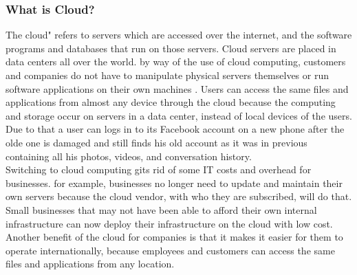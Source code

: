 			\subsubsection{What is Cloud?}
			The cloud" refers to servers which are accessed over the internet, and the software programs and databases that run on those  servers. Cloud servers are placed in data centers all over the world. by way of the use of cloud computing, customers and companies do not have to manipulate physical servers themselves or run software applications on their own machines \cite{cloudref1}. 
			Users can access the same files and applications from almost any device through the cloud because the  computing and storage occur on servers in a data center, instead of local devices of the users. Due to that a user can logs in to its Facebook account on a new phone after the olde one is damaged and still finds his old account as it was in previous containing all his photos, videos, and conversation history. \\
			Switching to cloud computing gits rid of some IT costs and overhead for businesses. for example, businesses no longer need to update and maintain their own servers because the cloud vendor, with who they are subscribed, will do that. Small businesses that may not have been able to afford their own internal infrastructure can now deploy their infrastructure on the cloud with low cost. Another benefit of the cloud for companies is that it makes it easier for them to operate internationally, because employees and customers can access the same files and applications from any location. 
			
